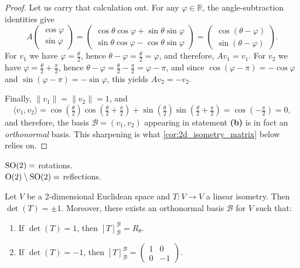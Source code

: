\begin{proof}
Let us carry that calculation out. For any $\varphi \in \mathbb{R}$, the angle-subtraction identities give
\[
    A \begin{pmatrix} \cos\varphi \\ \sin\varphi \end{pmatrix}
    = \begin{pmatrix} \cos\theta \cos\varphi + \sin\theta \sin\varphi \\ \sin\theta \cos\varphi - \cos\theta \sin\varphi \end{pmatrix}
    = \begin{pmatrix} \cos(\theta - \varphi) \\ \sin(\theta - \varphi) \end{pmatrix}.
\]
For $v_1$ we have $\varphi = \frac{\theta}{2}$, hence $\theta - \varphi = \frac{\theta}{2} = \varphi$, and therefore, $Av_1 = v_1$. For $v_2$ we have $\varphi = \frac{\theta}{2} + \frac{\pi}{2}$, hence $\theta - \varphi = \frac{\theta}{2} - \frac{\pi}{2} = \varphi - \pi$, and since $\cos(\varphi - \pi) = -\cos\varphi$ and $\sin(\varphi - \pi) = -\sin\varphi$, this yields $Av_2 = -v_2$.

Finally, $\|v_1\| = \|v_2\| = 1$, and
\[ \langle v_1, v_2 \rangle = \cos\left(\tfrac{\theta}{2}\right)\cos\left(\tfrac{\theta}{2} + \tfrac{\pi}{2}\right) + \sin\left(\tfrac{\theta}{2}\right)\sin\left(\tfrac{\theta}{2} + \tfrac{\pi}{2}\right) = \cos\left(-\tfrac{\pi}{2}\right) = 0, \]
and therefore, the basis $\mathcal{B} = (v_1, v_2)$ appearing in statement \textbf{(b)} is in fact an \emph{orthonormal} basis. This sharpening is what \cref{cor:2d_isometry_matrix} below relies on.
\end{proof}

\begin{summary}
$\operatorname{SO}(2) =$ rotations. \\
$\operatorname{O}(2) \setminus \operatorname{SO}(2) =$ reflections.
\end{summary}

\begin{corollary}
\label{cor:2d_isometry_matrix}
Let $V$ be a 2-di\-men\-sional Euclidean space and $T \colon V \to V$ a linear isometry. Then $\det(T) = \pm 1$. 
Moreover, there exists an orthonormal basis $\mathcal{B}$ for $V$ such that:
\begin{enumerate}
    \item If $\det(T) = 1$, then $[T]_{\mathcal{B}}^{\mathcal{B}} = R_\theta$.
    \item If $\det(T) = -1$, then $[T]_{\mathcal{B}}^{\mathcal{B}} = \left(\begin{smallmatrix} 1 & 0 \\ 0 & -1 \end{smallmatrix}\right)$.
\end{enumerate}
\end{corollary}

